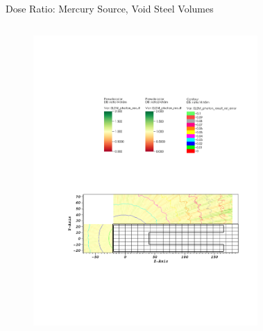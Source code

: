 \documentclass{beamer}
\begin{document}
\begin{frame}{Dose Ratio: Mercury Source, Void Steel Volumes}
\begin{columns}[T]
        \begin{figure}
                \includegraphics[scale=0.49,trim={6.75cm 16.5cm 11cm 6cm},clip]{figs/ratio_mer_void.pdf}
        \end{figure}
        \begin{figure}

\end{figure}
\end{columns}
\end{frame}
\end{document}
